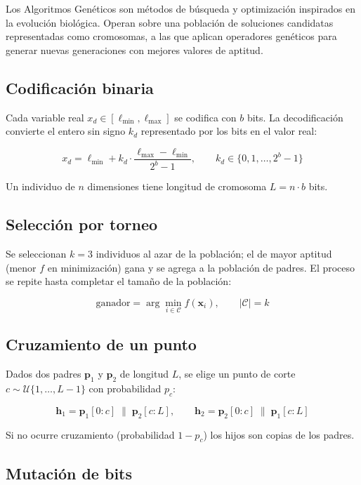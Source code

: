 \documentclass[11pt]{article}
\begin{document}
Los Algoritmos Gen\'eticos son m\'etodos de b\'usqueda y optimizaci\'on inspirados en la evoluci\'on biol\'ogica. Operan sobre una poblaci\'on de soluciones candidatas representadas como cromosomas, a las que aplican operadores gen\'eticos para generar nuevas generaciones con mejores valores de aptitud.

\subsection{Codificaci\'on binaria}

Cada variable real $x_d \in [\ell_{\min},\ell_{\max}]$ se codifica con $b$ bits. La decodificaci\'on convierte el entero sin signo $k_d$ representado por los bits en el valor real:

\[
x_d = \ell_{\min} + k_d \cdot \frac{\ell_{\max} - \ell_{\min}}{2^b - 1}, \qquad k_d \in \{0,1,\ldots,2^b-1\}
\]

Un individuo de $n$ dimensiones tiene longitud de cromosoma $L = n \cdot b$ bits.

\subsection{Selecci\'on por torneo}

Se seleccionan $k = 3$ individuos al azar de la poblaci\'on; el de mayor aptitud (menor $f$ en minimizaci\'on) gana y se agrega a la poblaci\'on de padres. El proceso se repite hasta completar el tama\~no de la poblaci\'on:

\[
\text{ganador} = \arg\min_{i \in \mathcal{C}} f\!\left(\mathbf{x}_i\right), \qquad |\mathcal{C}| = k
\]

\subsection{Cruzamiento de un punto}

Dados dos padres $\mathbf{p}_1$ y $\mathbf{p}_2$ de longitud $L$, se elige un punto de corte $c \sim \mathcal{U}\{1,\ldots,L-1\}$ con probabilidad $p_c$:

\[
\mathbf{h}_1 = \mathbf{p}_1[0{:}c]\;\|\;\mathbf{p}_2[c{:}L], \qquad
\mathbf{h}_2 = \mathbf{p}_2[0{:}c]\;\|\;\mathbf{p}_1[c{:}L]
\]

Si no ocurre cruzamiento (probabilidad $1-p_c$) los hijos son copias de los padres.

\subsection{Mutaci\'on de bits}
\end{document}
